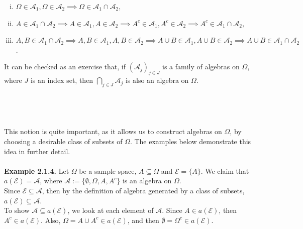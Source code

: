 \documentclass{article}
\begin{document}
\begin{enumerate}[(i)]
	\item $\Omega \in \mathcal{A}_1, \Omega \in \mathcal{A}_2 \implies \Omega \in \mathcal{A}_1 \cap \mathcal{A}_2$,
	\item $A \in \mathcal{A}_1 \cap \mathcal{A}_2 \implies A \in \mathcal{A}_1, A \in \mathcal{A}_2 \implies A^c \in \mathcal{A}_1, A^c \in \mathcal{A}_2 \implies A^c \in \mathcal{A}_1 \cap \mathcal{A}_2$,
	\item $A, B \in \mathcal{A}_1 \cap \mathcal{A}_2 \implies A,B \in \mathcal{A}_1, A,B \in \mathcal{A}_2 \implies A \cup B \in \mathcal{A}_1, A \cup B \in \mathcal{A}_2 \implies A \cup B \in \mathcal{A}_1 \cap \mathcal{A}_2$.
\end{enumerate}
It can be checked as an exercise that, if $(\mathcal{A}_j)_{j \in J}$ is a family of algebras on $\Omega$, where $J$ is an index set, then $\bigcap_{j \in J}\mathcal{A}_j$ is also an algebra on $\Omega$. \\\\
\noindent{}\\\\\\
This notion is quite important, as it allows us to construct algebras on $\Omega$, by choosing a desirable class of subsets of $\Omega$. The examples below demonstrate this idea in further detail.\\\\
\textbf{Example 2.1.4.} Let $\Omega$ be a sample space, $A \subseteq \Omega$ and $\mathcal{E} = \{A\}$. We claim that $a(\mathcal{E}) = \mathcal{A}$, where $\mathcal{A} := \{\emptyset, \Omega,  A, A^c\}$ is an algebra on $\Omega$.\\ Since $\mathcal{E} \subseteq \mathcal{A}$, then by the definition of algebra generated by a class of subsets, $a(\mathcal{E}) \subseteq \mathcal{A}$. \\ To show $\mathcal{A} \subseteq a(\mathcal{E})$, we look at each element of $\mathcal{A}$. Since $A \in a(\mathcal{E})$, then $A^c \in a(\mathcal{E})$. Also, $\Omega = A \cup A^c \in a(\mathcal{E})$, and then $\emptyset = \Omega^c \in a(\mathcal{E})$.\\\\
\end{document}
